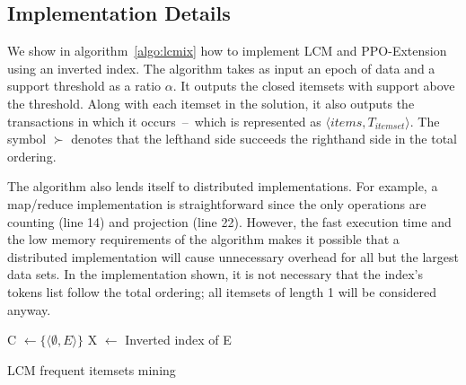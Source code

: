 \documentclass[letterpaper,12pt,titlepage,oneside,final]{book}
\begin{document}
\subsection{Implementation Details}
We show in algorithm~\ref{algo:lcmix} how to implement LCM and PPO-Extension
using an inverted index.
The algorithm takes as input an epoch of data and a support threshold as a
ratio $\alpha$.
It outputs the closed itemsets with support above the threshold.
Along with each itemset in the solution, it also outputs the transactions
in which it occurs~--~which is represented as $\langle items,
T_{itemset} \rangle$.
The symbol $\succ$ denotes that the lefthand side  succeeds the righthand
side in the total ordering.

The algorithm also lends itself to distributed implementations.
For example, a map/reduce implementation is straightforward since the only
operations are counting (line 14) and projection (line 22).
However, the fast execution time and the low memory requirements of the
algorithm makes it possible that a distributed implementation will
cause unnecessary overhead for all but the largest data sets.
In the implementation shown, it is not necessary that the index's tokens list
follow the total ordering; all itemsets of length 1 will be considered anyway. 

\begin{algorithm}
\SetAlgoLined
\LinesNumbered
{}

C $\gets \{\langle \emptyset, E\rangle\}$ 
X $\gets$ Inverted index of E\;
\;


\caption{LCM frequent itemsets mining}
\label{algo:lcmix}
\end{algorithm}
\end{document}
